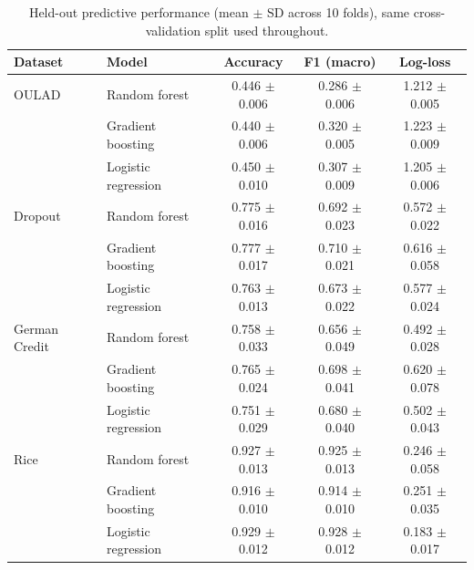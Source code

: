 \documentclass[11pt,twoside,a4paper]{article}
\begin{document}
\begin{table}[h]
\centering
\caption{Held-out predictive performance (mean $\pm$ SD across 10 folds), same cross-validation split used throughout.}
\label{tab:performance}
\begin{tabular}{llccc}
\toprule
Dataset & Model & Accuracy & F1 (macro) & Log-loss \\
\midrule
OULAD          & Random forest       & 0.446 $\pm$ 0.006 & 0.286 $\pm$ 0.006 & 1.212 $\pm$ 0.005 \\
               & Gradient boosting   & 0.440 $\pm$ 0.006 & 0.320 $\pm$ 0.005 & 1.223 $\pm$ 0.009 \\
               & Logistic regression & 0.450 $\pm$ 0.010 & 0.307 $\pm$ 0.009 & 1.205 $\pm$ 0.006 \\
Dropout        & Random forest       & 0.775 $\pm$ 0.016 & 0.692 $\pm$ 0.023 & 0.572 $\pm$ 0.022 \\
               & Gradient boosting   & 0.777 $\pm$ 0.017 & 0.710 $\pm$ 0.021 & 0.616 $\pm$ 0.058 \\
               & Logistic regression & 0.763 $\pm$ 0.013 & 0.673 $\pm$ 0.022 & 0.577 $\pm$ 0.024 \\
German Credit  & Random forest       & 0.758 $\pm$ 0.033 & 0.656 $\pm$ 0.049 & 0.492 $\pm$ 0.028 \\
               & Gradient boosting   & 0.765 $\pm$ 0.024 & 0.698 $\pm$ 0.041 & 0.620 $\pm$ 0.078 \\
               & Logistic regression & 0.751 $\pm$ 0.029 & 0.680 $\pm$ 0.040 & 0.502 $\pm$ 0.043 \\
Rice           & Random forest       & 0.927 $\pm$ 0.013 & 0.925 $\pm$ 0.013 & 0.246 $\pm$ 0.058 \\
               & Gradient boosting   & 0.916 $\pm$ 0.010 & 0.914 $\pm$ 0.010 & 0.251 $\pm$ 0.035 \\
               & Logistic regression & 0.929 $\pm$ 0.012 & 0.928 $\pm$ 0.012 & 0.183 $\pm$ 0.017 \\
\bottomrule
\end{tabular}
\end{table}
\end{document}
